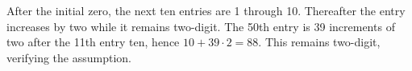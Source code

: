 After the initial zero, the next ten entries are 1 through 10. Thereafter the entry increases by two while it remains two-digit. The 50th entry is 39 increments of two after the 11th entry ten, hence $10+39\cdot2=\boxed{88}$. This remains two-digit, verifying the assumption.
